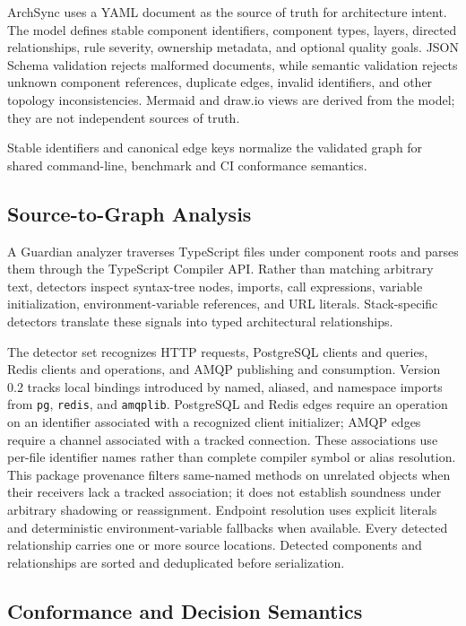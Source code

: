 \documentclass[conference]{IEEEtran}
\begin{document}
ArchSync uses a YAML document as the source of truth for architecture intent. The model defines stable component identifiers, component types, layers, directed relationships, rule severity, ownership metadata, and optional quality goals. JSON Schema validation rejects malformed documents, while semantic validation rejects unknown component references, duplicate edges, invalid identifiers, and other topology inconsistencies. Mermaid and draw.io views are derived from the model; they are not independent sources of truth.

Stable identifiers and canonical edge keys normalize the validated graph for shared command-line, benchmark and CI conformance semantics.

\subsection{Source-to-Graph Analysis}

A Guardian analyzer traverses TypeScript files under component roots and parses them through the TypeScript Compiler API. Rather than matching arbitrary text, detectors inspect syntax-tree nodes, imports, call expressions, variable initialization, environment-variable references, and URL literals. Stack-specific detectors translate these signals into typed architectural relationships.

The detector set recognizes HTTP requests, PostgreSQL clients and queries, Redis clients and operations, and AMQP publishing and consumption. Version 0.2 tracks local bindings introduced by named, aliased, and namespace imports from \texttt{pg}, \texttt{redis}, and \texttt{amqplib}. PostgreSQL and Redis edges require an operation on an identifier associated with a recognized client initializer; AMQP edges require a channel associated with a tracked connection. These associations use per-file identifier names rather than complete compiler symbol or alias resolution. This package provenance filters same-named methods on unrelated objects when their receivers lack a tracked association; it does not establish soundness under arbitrary shadowing or reassignment. Endpoint resolution uses explicit literals and deterministic environment-variable fallbacks when available. Every detected relationship carries one or more source locations. Detected components and relationships are sorted and deduplicated before serialization.

\subsection{Conformance and Decision Semantics}
\end{document}
